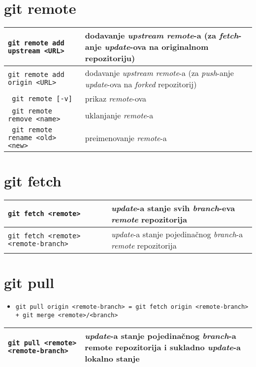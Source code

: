 \documentclass[10pt]{article}
\begin{document}
    \section*{git remote}
    \begin{tabular}{|>{\tt}p{9.00cm}|>{}p{15.50cm}|}
        \hline
        git remote add upstream <URL>                   & dodavanje \textit{upstream remote}-a (za \textit{fetch}-anje \textit{update}-ova na originalnom repozitoriju) \\ \hline
        git remote add origin <URL>                     & dodavanje \textit{upstream remote}-a (za \textit{push}-anje \textit{update}-ova na \textit{forked} repozitorij) \\ \hline
        git remote [-v]                                 & prikaz \textit{remote}-ova \\ \hline
        git remote remove <name>                        & uklanjanje \textit{remote}-a \\ \hline
        git remote rename <old> <new>                   & preimenovanje \textit{remote}-a \\ \hline                   
    \end{tabular}

    \section*{git fetch}
    \begin{tabular}{|>{\tt}p{9.00cm}|>{}p{15.50cm}|}
        \hline
        git fetch <remote>                              & \textit{update}-a stanje svih \textit{branch}-eva \textit{remote} repozitorija \\ \hline
        git fetch <remote> <remote-branch>              & \textit{update}-a stanje pojedinačnog \textit{branch}-a \textit{remote} repozitorija \\ \hline                
    \end{tabular}

    \section*{git pull}
    \begin{itemize}
        \item \texttt{git pull origin <remote-branch> = git fetch origin <remote-branch> + git merge <remote>/<branch>}
    \end{itemize}
    \begin{tabular}{|>{\tt}p{9.00cm}|>{}p{15.50cm}|}
        \hline
        git pull <remote> <remote-branch>              & \textit{update}-a stanje pojedinačnog \textit{branch}-a remote repozitorija i sukladno \textit{update}-a lokalno stanje \\ \hline                
    \end{tabular}
\end{document}
